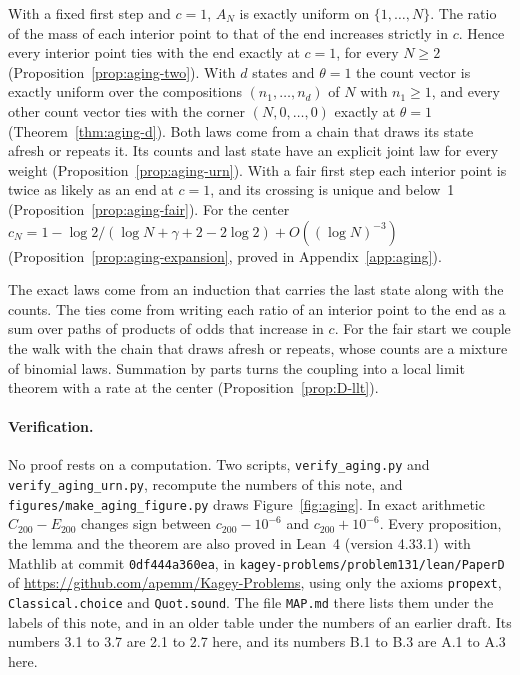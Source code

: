 With a fixed first step and $c=1$, $A_N$ is exactly uniform on
$\{1,\dots,N\}$. The ratio of the mass of each interior point to that of the end increases
strictly in $c$. Hence every interior point ties with the end exactly at $c=1$, for every
$N\ge2$ (Proposition~\ref{prop:aging-two}). With $d$ states and $\theta=1$ the
count vector is exactly uniform over the compositions $(n_1,\dots,n_d)$ of $N$
with $n_1\ge1$, and every other count vector ties with the corner $(N,0,\dots,0)$
exactly at $\theta=1$ (Theorem~\ref{thm:aging-d}). Both laws come from a chain
that draws its state afresh or repeats it. Its counts and last state have an
explicit joint law for every weight (Proposition~\ref{prop:aging-urn}). With a
fair first step each interior point is twice as likely as an end at $c=1$, and
its crossing is unique and below~1 (Proposition~\ref{prop:aging-fair}). For
the center
$c_N=1-\log2/(\log N+\gamma+2-2\log2)+O((\log N)^{-3})$
(Proposition~\ref{prop:aging-expansion}, proved in Appendix~\ref{app:aging}).

The exact laws come from an induction that carries the last state along with
the counts. The ties come from writing each ratio of an interior point to the end as a sum
over paths of products of odds that increase in $c$. For the fair start we
couple the walk with the chain that draws afresh or repeats, whose counts are
a mixture of binomial laws. Summation by parts turns the coupling into a local
limit theorem with a rate at the center (Proposition~\ref{prop:D-llt}).

\paragraph{Verification.}\label{sec:verify}
No proof rests on a computation. Two scripts, \nolinkurl{verify_aging.py}
and \nolinkurl{verify_aging_urn.py}, recompute the numbers of this note,
and \nolinkurl{figures/make_aging_figure.py} draws Figure~\ref{fig:aging}. In exact
arithmetic $C_{200}-E_{200}$ changes sign between $c_{200}-10^{-6}$ and $c_{200}+10^{-6}$. Every
proposition, the lemma and the theorem are also proved in Lean~4 (version 4.33.1) with
Mathlib at commit \texttt{0df444a360ea}, in
\nolinkurl{kagey-problems/problem131/lean/PaperD} of
\url{https://github.com/apemm/Kagey-Problems}, using only the axioms
\texttt{propext}, \texttt{Classical.choice} and \texttt{Quot.sound}. The file
\nolinkurl{MAP.md} there lists them under the labels of this note, and in an older table
under the numbers of an earlier draft.
Its numbers 3.1 to 3.7 are 2.1 to 2.7 here, and its numbers B.1 to B.3 are
A.1 to A.3 here.

